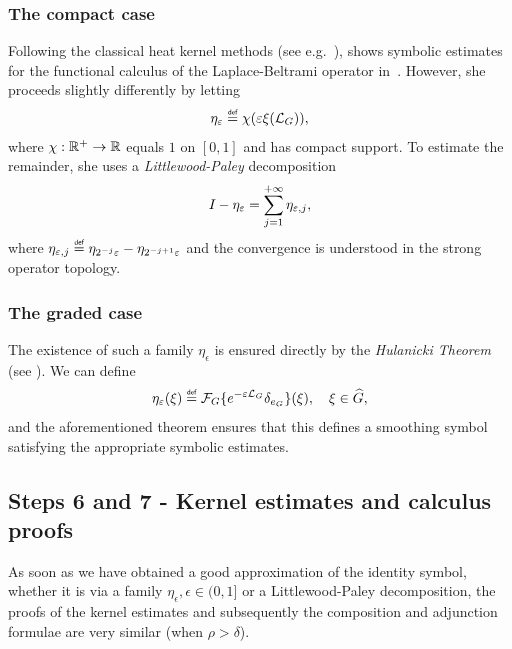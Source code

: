 \subsubsection{The compact case}

Following the classical heat kernel methods (see e.g.~\cite{FurioliMelziVeneruso06,VaropoulosSaloffCosteCoulhon92}),
\citeauthor{Fischer2015} shows symbolic estimates for the functional calculus of the Laplace-Beltrami operator in~\cite{Fischer2015}.
However, she proceeds slightly differently by letting
\begin{align*}
    \eta_\epsilon
    \defeq \chi(\epsilon \xi(\Laplacian [\Group])),
\end{align*}
where $\chi : \mathbb{R}^+ \to \mathbb{R}$ equals $1$ on $[0, 1]$ and has compact support.
To estimate the remainder,
she uses a \emph{Littlewood-Paley} decomposition
\begin{align*}
    {I_{}} - \eta_\varepsilon = \sum_{j = 1}^{+\infty} \eta_{\varepsilon, j},
\end{align*}
where $\eta_{\epsilon, j} \defeq \eta_{2^{-j} \epsilon} - \eta_{2^{-j + 1} \epsilon}$
and the convergence is understood in the strong operator topology.

\subsubsection{The graded case}

The existence of such a family $\eta_\epsilon$ is ensured directly by the \emph{Hulanicki Theorem} (see \cite[Theorem 4.5.1]{FischerRuzhansky16}).
We can define
\begin{align*}
    \eta_\epsilon(\xi) \defeq \Fourier \{\e^{-\epsilon \Laplacian} \delta_{e_\Group}\}(\xi),
    \quad \xi \in \dualGroup \Group,
\end{align*}
and the aforementioned theorem ensures that this defines a smoothing symbol satisfying the appropriate symbolic estimates.

\subsection*{Steps 6 and 7 - Kernel estimates and calculus proofs}

As soon as we have obtained a good approximation of the identity symbol,
whether it is via a family $\eta_\epsilon, \epsilon \in (0, 1]$
or a Littlewood-Paley decomposition,
the proofs of the kernel estimates and subsequently the composition and adjunction formulae are very similar (when $\rho > \delta$).

